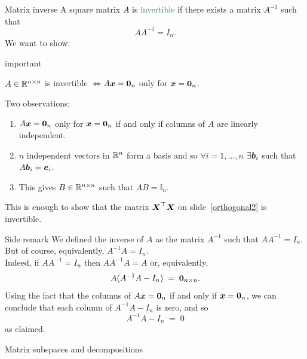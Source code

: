 \documentclass{beamer}
\begin{document}
\begin{frame}{Matrix inverse}
A square matrix $A$ is \textcolor{SeaGreen}{invertible} if there exists a matrix $A^{-1}$ such that
$$
A A^{-1}=I_n.
$$
	We want to show:
		\begin{beamercolorbox}[wd=\paperwidth,sep=0pt]{important}	
		\begin{center}
$A\in \mathbb R^{n\times n}$ is invertible \quad $\Longleftrightarrow$\quad $A\boldsymbol x=\boldsymbol 0_n$ only for $\boldsymbol x= \boldsymbol 0_n$.		
		\end{center}
\end{beamercolorbox}
Two observations:
\begin{enumerate}
	\item $A\boldsymbol x=\boldsymbol 0_n$ only for $\boldsymbol x=\boldsymbol 0_n$ if and only if  columns of $A$ are linearly independent.
	\item $n$ independent vectors in $\mathbb R^n$ form a basis and so $\forall i=1,\ldots, n$ $\exists \boldsymbol b_i$ such that $A\boldsymbol b_i=\boldsymbol e_i$.
	\item This gives $B\in \mathbb R^{n\times n}$ such that $AB=\mathbb I_n$.
\end{enumerate}
\bigskip

This is enough to show that the matrix $\boldsymbol X^\top\boldsymbol X$ on slide~\ref{orthogonal2} is invertible.\\
\end{frame}

\begin{frame}{Side remark}
	We defined the inverse of $A$ as the matrix $A^{-1}$ such that $AA^{-1}=I_n$.\\[3mm] 
	But of course, equivalently, $A^{-1}A=I_n$.\\[3mm]
	Indeed, if $AA^{-1}=I_n$ then $AA^{-1}A=A$ or, equivalently,
	$$
	A(A^{-1}A-I_n)\;=\;\boldsymbol 0_{n\times n}.
	$$
	Using the fact that the columns of $A\boldsymbol x=\boldsymbol 0_n$ if and only if $\boldsymbol x=\boldsymbol 0_n$, we can conclude that each column of  $A^{-1}A-I_n$ is zero, and so 
	$$
	A^{-1}A-I_n\;=\;0
	$$
	as claimed.
\end{frame}

\begin{frame} \begin{center}
	\alert{\Huge Matrix subspaces and decompositions}
\end{center}\end{frame}
\end{document}
